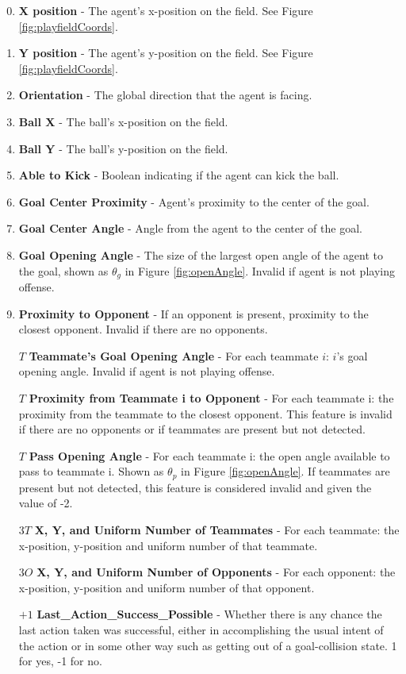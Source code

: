 \documentclass[12pt]{article}
\begin{document}
\begin{enumerate}[noitemsep]
\setcounter{enumi}{-1}
\item{\textbf{X position} - The agent’s x-position on the field. See
  Figure \ref{fig:playfieldCoords}.}
\item{\textbf{Y position} - The agent’s y-position on the field. See
  Figure \ref{fig:playfieldCoords}.}
\item{\textbf{Orientation} - The global direction that the agent is facing.}
\item{\textbf{Ball X} - The ball's x-position on the field.}
\item{\textbf{Ball Y} - The ball's y-position on the field.}
\item{\textbf{Able to Kick} - Boolean indicating if the agent can kick the ball.}
\item{\textbf{Goal Center Proximity} - Agent's proximity to the center of the goal.}
\item{\textbf{Goal Center Angle} - Angle from the agent to the center of the goal.}
\item{\textbf{Goal Opening Angle} - The size of the largest open angle
  of the agent to the goal, shown as $\theta_g$ in Figure
  \ref{fig:openAngle}. Invalid if agent is not playing offense.}
\item{\textbf{Proximity to Opponent} - If an opponent is present,
  proximity to the closest opponent. Invalid if there are no
  opponents.}
\item [$T$] {\textbf{Teammate's Goal Opening Angle} - For each
  teammate $i$: $i$’s goal opening angle. Invalid if agent is not
  playing offense.}
\item [$T$] {\textbf{Proximity from Teammate i to Opponent} - For each
  teammate i: the proximity from the teammate to the closest
  opponent. This feature is invalid if there are no opponents or if
  teammates are present but not detected.}
\item [$T$] {\textbf{Pass Opening Angle} - For each teammate i: the open
  angle available to pass to teammate i. Shown as $\theta_p$ in Figure
  \ref{fig:openAngle}. If teammates are present but not detected, this
  feature is considered invalid and given the value of -2.}
\item [$3T$] {\textbf{X, Y, and Uniform Number of
    Teammates} - For each teammate: the x-position, y-position and
  uniform number of that teammate.}
\item [$3O$] {\textbf{X, Y, and Uniform Number of
    Opponents} - For each opponent: the x-position, y-position and
  uniform number of that opponent.}
\item [$+1$] {\textbf{Last\_Action\_Success\_Possible} - Whether there is any chance
	the last action taken was successful, either in accomplishing the
	usual intent of the action or in some other way such as getting out of
	a goal-collision state. 1 for yes, -1 for no.}
\end{enumerate}
\end{document}

